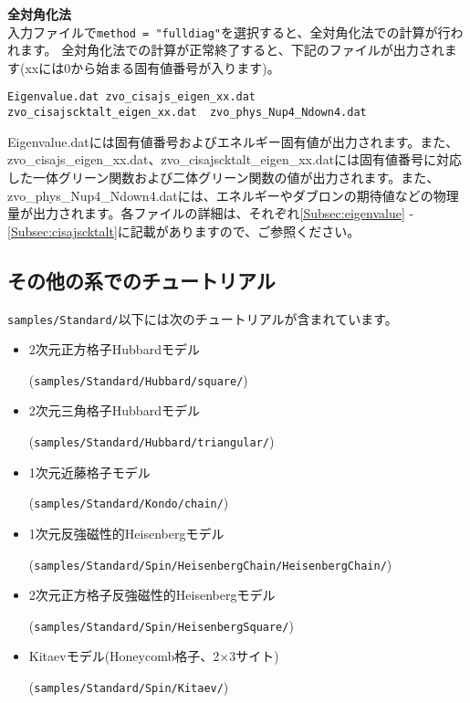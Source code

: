 \begin{description}
\item {\bf 全対角化法}\\
入力ファイルで\verb|method = "fulldiag"|を選択すると、全対角化法での計算が行われます。
全対角化法での計算が正常終了すると、下記のファイルが出力されます(xxには0から始まる固有値番号が入ります)。\\
\begin{minipage}{14cm}
\begin{screen}
\begin{verbatim}
Eigenvalue.dat zvo_cisajs_eigen_xx.dat
zvo_cisajscktalt_eigen_xx.dat  zvo_phys_Nup4_Ndown4.dat
\end{verbatim}
\end{screen}
\end{minipage}

Eigenvalue.datには固有値番号およびエネルギー固有値が出力されます。また、zvo\_cisajs\_eigen\_xx.dat、zvo\_cisajscktalt\_eigen\_xx.datには固有値番号に対応した一体グリーン関数および二体グリーン関数の値が出力されます。また、zvo\_phys\_Nup4\_Ndown4.datには、エネルギーやダブロンの期待値などの物理量が出力されます。各ファイルの詳細は、それぞれ\ref{Subsec:eigenvalue} - \ref{Subsec:cisajscktalt}に記載がありますので、ご参照ください。


\end{description}

\subsection{その他の系でのチュートリアル}

\verb|samples/Standard/|以下には次のチュートリアルが含まれています。

\begin{itemize}
\item 2次元正方格子Hubbardモデル

  (\verb|samples/Standard/Hubbard/square/|)
\item 2次元三角格子Hubbardモデル

  (\verb|samples/Standard/Hubbard/triangular/|)
\item 1次元近藤格子モデル

  (\verb|samples/Standard/Kondo/chain/|)
\item 1次元反強磁性的Heisenbergモデル

  (\verb|samples/Standard/Spin/HeisenbergChain/HeisenbergChain/|)
\item 2次元正方格子反強磁性的Heisenbergモデル

  (\verb|samples/Standard/Spin/HeisenbergSquare/|)
\item Kitaevモデル(Honeycomb格子、2$\times$3サイト)

  (\verb|samples/Standard/Spin/Kitaev/|)

\end{itemize}

